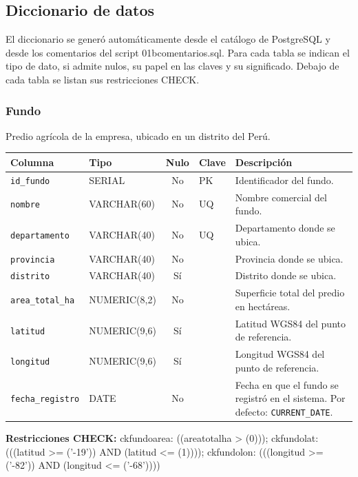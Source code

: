 \documentclass[11pt,letterpaper]{article}
\newcommand{\tbus}{\textunderscore\allowbreak}
\newcommand{\tb}[1]{{\ttfamily\let\_\tbus #1}}
\begin{document}
\subsection{Diccionario de datos}

El diccionario se generó automáticamente desde el catálogo de PostgreSQL y desde los comentarios del script \tb{01b\_comentarios.sql}. Para cada tabla se indican el tipo de dato, si admite nulos, su papel en las claves y su significado. Debajo de cada tabla se listan sus restricciones \tb{CHECK}.

\subsubsection*{Fundo}
Predio agrícola de la empresa, ubicado en un distrito del Perú.
{\footnotesize
\begin{longtable}{>{\raggedright\arraybackslash}p{3.3cm}>{\raggedright\arraybackslash}p{2.5cm}c>{\raggedright\arraybackslash}p{2.2cm}>{\raggedright\arraybackslash}p{6.1cm}}
\toprule
\textbf{Columna} & \textbf{Tipo} & \textbf{Nulo} & \textbf{Clave} & \textbf{Descripción} \\
\midrule
\endhead
\texttt{id\_fundo} & SERIAL & No & PK & Identificador del fundo. \\
\texttt{nombre} & VARCHAR(60) & No & UQ & Nombre comercial del fundo. \\
\texttt{departamento} & VARCHAR(40) & No & UQ & Departamento donde se ubica. \\
\texttt{provincia} & VARCHAR(40) & No &  & Provincia donde se ubica. \\
\texttt{distrito} & VARCHAR(40) & Sí &  & Distrito donde se ubica. \\
\texttt{area\_total\_ha} & NUMERIC(8,2) & No &  & Superficie total del predio en hectáreas. \\
\texttt{latitud} & NUMERIC(9,6) & Sí &  & Latitud WGS84 del punto de referencia. \\
\texttt{longitud} & NUMERIC(9,6) & Sí &  & Longitud WGS84 del punto de referencia. \\
\texttt{fecha\_registro} & DATE & No &  & Fecha en que el fundo se registró en el sistema. Por defecto: \texttt{CURRENT\_DATE}. \\
\bottomrule
\end{longtable}}
{\footnotesize\raggedright\textbf{Restricciones CHECK:} \tb{ck\_fundo\_area}: \tb{((area\_total\_ha > (0)))}; \tb{ck\_fundo\_lat}: \tb{(((latitud >= ('-19')) AND (latitud <= (1))))}; \tb{ck\_fundo\_lon}: \tb{(((longitud >= ('-82')) AND (longitud <= ('-68'))))}\par}
\medskip
\end{document}
